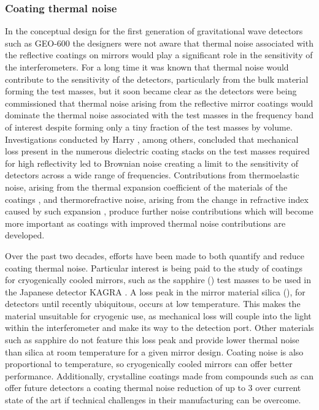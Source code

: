 \subsubsection{\label{sec:coating-thermal-noise}Coating thermal noise}
In the conceptual design for the first generation of gravitational wave detectors such as GEO-600 \cite{Willke2002} the designers were not aware that thermal noise associated with the reflective coatings on mirrors would play a significant role in the sensitivity of the interferometers. For a long time it was known that thermal noise would contribute to the sensitivity of the detectors, particularly from the bulk material forming the test masses, but it soon became clear as the detectors were being commissioned that thermal noise arising from the reflective mirror coatings would dominate the thermal noise associated with the test masses in the frequency band of interest despite forming only a tiny fraction of the test masses by volume. Investigations conducted by Harry \etal{} \cite{Harry2002, Harry2007}, among others, concluded that mechanical loss present in the numerous dielectric coating stacks on the test masses required for high reflectivity led to Brownian noise creating a limit to the sensitivity of detectors across a wide range of frequencies. Contributions from thermoelastic noise, arising from the thermal expansion coefficient of the materials of the coatings \cite{Braginsky1999a}, and thermorefractive noise, arising from the change in refractive index caused by such expansion \cite{Braginsky2000a}, produce further noise contributions which will become more important as coatings with improved thermal noise contributions are developed.

Over the past two decades, efforts have been made to both quantify and reduce coating thermal noise. Particular interest is being paid to the study of coatings for cryogenically cooled mirrors, such as the sapphire () test masses to be used in the Japanese detector \gls{KAGRA} \cite{Somiya2012}. A loss peak in the mirror material silica (), for detectors until recently ubiquitous, occurs at low temperature. This makes the material unsuitable for cryogenic use, as mechanical loss will couple into the light within the interferometer and make its way to the detection port. Other materials such as sapphire do not feature this loss peak and provide lower thermal noise than silica at room temperature for a given mirror design. Coating noise is also proportional to temperature, so cryogenically cooled mirrors can offer better performance. Additionally, crystalline coatings made from compounds such as  can offer future detectors a coating thermal noise reduction of up to 3 over current state of the art \cite{Cole2013} if technical challenges in their manufacturing can be overcome.

